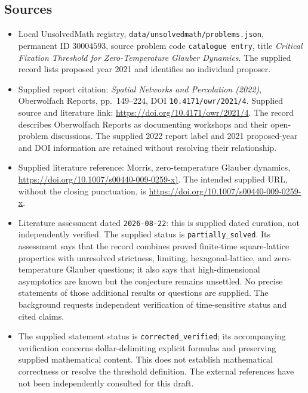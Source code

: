 \documentclass[11pt]{article}
\begin{document}
\subsection{Sources}
\begin{itemize}
\item Local UnsolvedMath registry, \texttt{data/unsolvedmath/problems.json}, permanent ID \(30004593\), source problem code \texttt{catalogue entry}, title \emph{Critical Fixation Threshold for Zero-Temperature Glauber Dynamics}. The supplied record lists proposed year 2021 and identifies no individual proposer.
\item Supplied report citation: \emph{Spatial Networks and Percolation (2022)}, Oberwolfach Reports, pp.\ 149--224, DOI \texttt{10.4171/owr/2021/4}. Supplied source and literature link: \url{https://doi.org/10.4171/owr/2021/4}. The record describes Oberwolfach Reports as documenting workshops and their open-problem discussions. The supplied 2022 report label and 2021 proposed-year and DOI information are retained without resolving their relationship.
\item Supplied literature reference: Morris, zero-temperature Glauber dynamics, \url{https://doi.org/10.1007/s00440-009-0259-x)}. The intended supplied URL, without the closing punctuation, is \url{https://doi.org/10.1007/s00440-009-0259-x}.
\item Literature assessment dated \texttt{2026-08-22}: this is supplied dated curation, not independently verified. The supplied status is \texttt{partially\_solved}. Its assessment says that the record combines proved finite-time square-lattice properties with unresolved strictness, limiting, hexagonal-lattice, and zero-temperature Glauber questions; it also says that high-dimensional asymptotics are known but the conjecture remains unsettled. No precise statements of those additional results or questions are supplied. The background requests independent verification of time-sensitive status and cited claims.
\item The supplied statement status is \texttt{corrected\_verified}; its accompanying verification concerns dollar-delimiting explicit formulas and preserving supplied mathematical content. This does not establish mathematical correctness or resolve the threshold definition. The external references have not been independently consulted for this draft.
\end{itemize}
\end{document}
